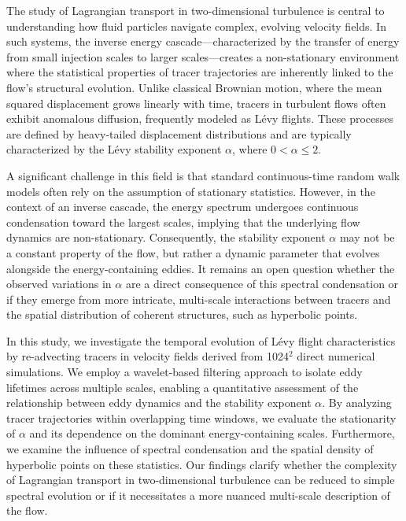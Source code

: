 \documentclass[]{article}
\begin{document}
The study of Lagrangian transport in two-dimensional turbulence is central to understanding how fluid particles navigate complex, evolving velocity fields. In such systems, the inverse energy cascade—characterized by the transfer of energy from small injection scales to larger scales—creates a non-stationary environment where the statistical properties of tracer trajectories are inherently linked to the flow's structural evolution. Unlike classical Brownian motion, where the mean squared displacement grows linearly with time, tracers in turbulent flows often exhibit anomalous diffusion, frequently modeled as Lévy flights. These processes are defined by heavy-tailed displacement distributions and are typically characterized by the Lévy stability exponent $\alpha$, where $0 < \alpha \leq 2$.

A significant challenge in this field is that standard continuous-time random walk models often rely on the assumption of stationary statistics. However, in the context of an inverse cascade, the energy spectrum undergoes continuous condensation toward the largest scales, implying that the underlying flow dynamics are non-stationary. Consequently, the stability exponent $\alpha$ may not be a constant property of the flow, but rather a dynamic parameter that evolves alongside the energy-containing eddies. It remains an open question whether the observed variations in $\alpha$ are a direct consequence of this spectral condensation or if they emerge from more intricate, multi-scale interactions between tracers and the spatial distribution of coherent structures, such as hyperbolic points.

In this study, we investigate the temporal evolution of Lévy flight characteristics by re-advecting tracers in velocity fields derived from 1024$^2$ direct numerical simulations. We employ a wavelet-based filtering approach to isolate eddy lifetimes across multiple scales, enabling a quantitative assessment of the relationship between eddy dynamics and the stability exponent $\alpha$. By analyzing tracer trajectories within overlapping time windows, we evaluate the stationarity of $\alpha$ and its dependence on the dominant energy-containing scales. Furthermore, we examine the influence of spectral condensation and the spatial density of hyperbolic points on these statistics. Our findings clarify whether the complexity of Lagrangian transport in two-dimensional turbulence can be reduced to simple spectral evolution or if it necessitates a more nuanced multi-scale description of the flow.
\end{document}
